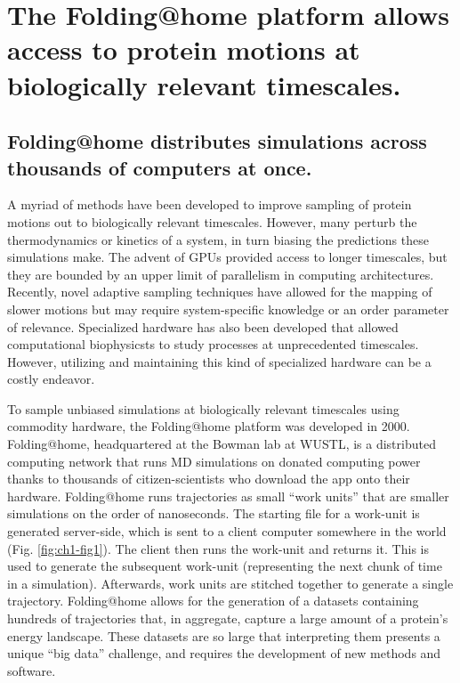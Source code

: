 \documentclass[../main.tex]{subfiles}
\begin{document}
\section{The Folding@home platform allows access to protein motions at biologically relevant timescales.}
	\subsection{Folding@home distributes simulations across thousands of computers at once.}
		A myriad of methods have been developed to improve sampling of protein motions out to biologically relevant timescales\cite{E:2010hs,hamelberg_accelerated_2004,paschek_replica_2007,piana_bias-exchange_2007}. However, many perturb the thermodynamics or kinetics of a system, in turn biasing the predictions these simulations make. The advent of GPUs provided access to longer timescales, but they are bounded by an upper limit of parallelism in computing architectures\cite{stone_accelerating_2007,friedrichs_accelerating_2009,eastman_openmm:_2010,eastman_openmm_2017}. Recently, novel adaptive sampling techniques have allowed for the mapping of slower motions\cite{zimmerman_fast_2015} but may require system-specific knowledge or an order parameter of relevance. Specialized hardware has also been developed\cite{shaw_anton_2008} that allowed computational biophysicsts to study processes at unprecedented timescales. However, utilizing and maintaining this kind of specialized hardware can be a costly endeavor. 

		To sample unbiased simulations at biologically relevant timescales using commodity hardware, the Folding@home platform was developed in 2000\cite{Shirts:2000du}. Folding@home, headquartered at the Bowman lab at WUSTL, is a distributed computing network that runs MD simulations on donated computing power thanks to thousands of citizen-scientists who download the app onto their hardware. Folding@home runs trajectories as small “work units” that are smaller simulations on the order of nanoseconds. The starting file for a work-unit is generated server-side, which is sent to a client computer somewhere in the world (Fig. \ref{fig:ch1-fig1}). The client then runs the work-unit and returns it. This is used to generate the subsequent work-unit (representing the next chunk of time in a simulation). Afterwards, work units are stitched together to generate a single trajectory. Folding@home allows for the generation of a datasets containing hundreds of trajectories that, in aggregate, capture a large amount of a protein's energy landscape. These datasets are so large that interpreting them presents a unique “big data” challenge, and requires the development of new methods and software\cite{Husic:2018iz,porter2018enspara}.
\end{document}
